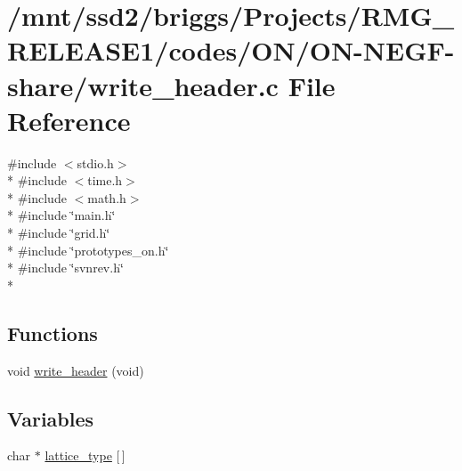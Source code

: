 \hypertarget{_o_n_2_o_n-_n_e_g_f-share_2write__header_8c}{\section{/mnt/ssd2/briggs/\-Projects/\-R\-M\-G\-\_\-\-R\-E\-L\-E\-A\-S\-E1/codes/\-O\-N/\-O\-N-\/\-N\-E\-G\-F-\/share/write\-\_\-header.c File Reference}
\label{_o_n_2_o_n-_n_e_g_f-share_2write__header_8c}
}
{\ttfamily \#include $<$stdio.\-h$>$}\\*
{\ttfamily \#include $<$time.\-h$>$}\\*
{\ttfamily \#include $<$math.\-h$>$}\\*
{\ttfamily \#include \char`\"{}main.\-h\char`\"{}}\\*
{\ttfamily \#include \char`\"{}grid.\-h\char`\"{}}\\*
{\ttfamily \#include \char`\"{}prototypes\-\_\-on.\-h\char`\"{}}\\*
{\ttfamily \#include \char`\"{}svnrev.\-h\char`\"{}}\\*
\subsection*{Functions}
\begin{DoxyCompactItemize}
\item 
void \hyperlink{_o_n_2_o_n-_n_e_g_f-share_2write__header_8c_aa87a0aba67f32b1021d78edfb043ec71}{write\-\_\-header} (void)
\end{DoxyCompactItemize}
\subsection*{Variables}
\begin{DoxyCompactItemize}
\item 
char $\ast$ \hyperlink{_o_n_2_o_n-_n_e_g_f-share_2write__header_8c_a1b9ed72e036c63a5df3fbac5f015f6bc}{lattice\-\_\-type} \mbox{[}$\,$\mbox{]}
\end{DoxyCompactItemize}


